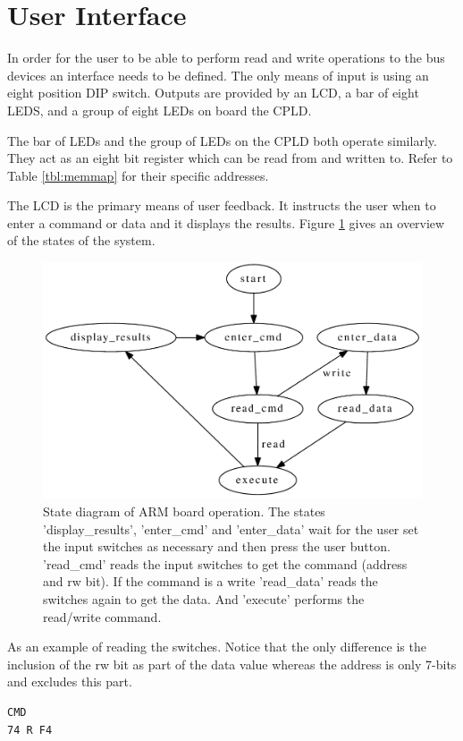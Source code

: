 \documentclass{article}
\begin{document}
\section{User Interface}

In order for the user to be able to perform read and write
operations to the bus devices an interface needs to be defined.
The only means of input is using an eight position DIP switch.
Outputs are provided by an LCD, a bar of eight LEDS,
and a group of eight LEDs on board the CPLD.

The bar of LEDs and the group of LEDs on the CPLD both operate
similarly.
They act as an eight bit register which can be read from and written to.
Refer to Table \ref{tbl:memmap} for their specific addresses.

The LCD is the primary means of user feedback.
It instructs the user when to enter a command or data and
it displays the results.
Figure \ref{fig:armstate} gives an overview of the states of
the system.

\begin{figure}
\center
\includegraphics[scale=0.8]{figure/arm-state_diagram/arm-state_diagram}
\caption{State diagram of ARM board operation.
The states 'display\_results', 'enter\_cmd' and 'enter\_data'
wait for the user set the input switches as necessary and then press
the user button.
'read\_cmd' reads the input switches to get the command (address and rw bit).
If the command is a write 'read\_data' reads the switches again to get the data.
And 'execute' performs the read/write command.
}
\label{fig:armstate}
\end{figure}

As an example of reading the switches.
Notice that the only difference is the inclusion of the
rw bit as part of the data value whereas the address
is only 7-bits and excludes this part.
\begin{verbatim}
CMD
74 R F4
\end{verbatim}
\end{document}
